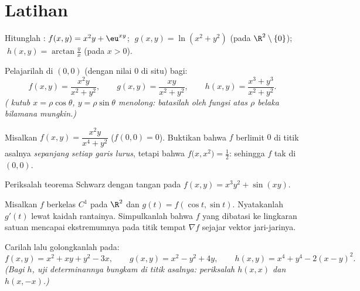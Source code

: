 \section{Latihan}

\begin{exercise}[$\star$]\label{exo:b1:multivar:1}
Hitunglah :
$f(x,y) = x^2 y + \eu^{xy}$; $\;g(x,y) = \ln(x^2 + y^2)$ (pada
$\R^2\setminus\{0\}$); $\;h(x,y) = \arctan\frac yx$ (pada $x > 0$).
\end{exercise}

\begin{exercise}[$\star$]\label{exo:b1:multivar:2}
Pelajarilah  di $(0,0)$ (dengan nilai $0$ di situ) bagi:
\[
f(x,y) = \frac{x^2 y}{x^2 + y^2},
\qquad
g(x,y) = \frac{xy}{x^2 + y^2},
\qquad
h(x,y) = \frac{x^3 + y^3}{x^2 + y^2}.
\]
\emph{( kutub $x = \rho\cos\theta$, $y = \rho\sin\theta$
menolong: batasilah oleh fungsi atas $\rho$ belaka bilamana mungkin.)}
\end{exercise}

\begin{exercise}[$\star\star$]\label{exo:b1:multivar:3}
Misalkan $f(x,y) = \dfrac{x^2 y}{x^4 + y^2}$ ($f(0,0) = 0$). Buktikan bahwa
$f$ berlimit $0$ di titik asalnya \emph{sepanjang setiap garis lurus},
tetapi bahwa $f\bigl(x, x^2\bigr) = \frac12$: sehingga $f$ tak  di
$(0,0)$.
\end{exercise}

\begin{exercise}[$\star$]\label{exo:b1:multivar:4}
Periksalah teorema Schwarz dengan tangan pada $f(x, y) = x^3 y^2 + \sin(xy)$.
\end{exercise}

\begin{exercise}[$\star\star$]\label{exo:b1:multivar:5}
Misalkan $f$ berkelas $C^1$ pada $\R^2$ dan $g(t) = f(\cos t, \sin t)$. Nyatakanlah
$g'(t)$ lewat kaidah rantainya. Simpulkanlah bahwa $f$ yang dibatasi ke lingkaran
satuan mencapai ekstremumnya pada titik tempat $\nabla f$ sejajar
vektor jari-jarinya.
\end{exercise}

\begin{exercise}[$\star\star$]\label{exo:b1:multivar:6}
Carilah lalu golongkanlah  pada:
\[
f(x, y) = x^2 + xy + y^2 - 3x,
\qquad
g(x, y) = x^2 - y^2 + 4y,
\qquad
h(x, y) = x^4 + y^4 - 2(x - y)^2 .
\]
\emph{(Bagi $h$, uji determinannya bungkam di titik asalnya:
periksalah $h(x, x)$ dan $h(x, -x)$.)}
\end{exercise}

